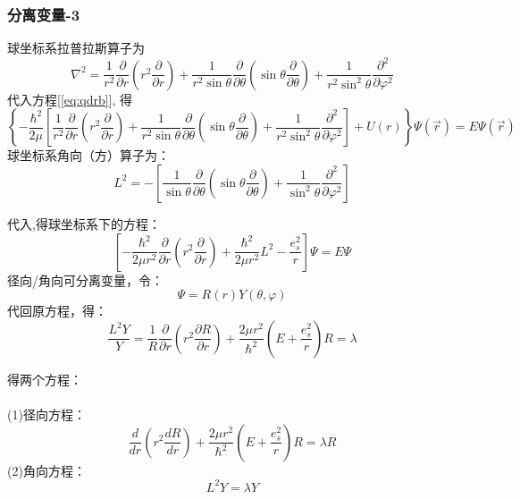 \begin{frame}
\frametitle{分离变量-3}	
球坐标系拉普拉斯算子为 
$$\nabla ^2 =\frac{1}{r^2} \frac{\partial }{\partial r} (r^2\frac{\partial }{\partial r} )+
\frac{1}{r^2 \sin \theta  } \frac{\partial }{\partial \theta } (\sin \theta \frac{\partial }{\partial \theta } )
+\frac{1}{r^2 \sin^2 \theta  } \frac{\partial^2}{\partial\varphi ^2}$$
代入方程[\ref{eq:qdrb}], 得
{\small \begin{equation*}
  \left\{-\frac{\hbar^2}{2 \mu} \left[\frac{1}{r^2} \frac{\partial }{\partial r} (r^2\frac{\partial }{\partial r} )+
  \frac{1}{r^2 \sin \theta  } \frac{\partial }{\partial \theta } (\sin \theta \frac{\partial }{\partial \theta } )
  +\frac{1}{r^2 \sin^2 \theta  } \frac{\partial^2}{\partial\varphi ^2}\right] +U(r) \right\} \Psi (\vec{r}) =E \Psi (\vec{r}) 
\end{equation*}}
球坐标系角向（方）算子为：
\begin{equation*}
  L^2 =  -\left[ \frac{1}{ \sin \theta  } \frac{\partial }{\partial \theta } (\sin \theta \frac{\partial }{\partial \theta } )
  +\frac{1}{ \sin^2 \theta  } \frac{\partial^2}{\partial\varphi ^2} \right]
\end{equation*}		
\end{frame}	

\begin{frame}
代入,得球坐标系下的方程：
\begin{equation*}
  \left[-\frac{\hbar^2}{2 \mu r^2}  \frac{\partial }{\partial r} (r^2\frac{\partial }{\partial r} ) +  \frac{\hbar ^2 }{2 \mu r^2} L^2  -\frac{e_s ^2}{r} \right] \Psi
  =E\Psi
\end{equation*}
径向/角向可分离变量，令： 
\begin{equation*}
  \Psi=R (r) Y(\theta,\varphi)
\end{equation*}	
代回原方程，得：
\begin{equation*}
  \frac{ L^2 Y}{Y}= \frac{1}{R}   \frac{\partial }{\partial r} (r^2\frac{\partial R }{\partial r} ) + \frac{2 \mu r^2} {\hbar^2}(E+ \frac{e_s ^2}{r} ) R =\lambda
\end{equation*}	
\end{frame}		

\begin{frame}
得两个方程：	\\
~~\\ 
(1)径向方程：
\begin{equation*}
  \frac{d}{d r} (r^2\frac{d R }{d r} ) + \frac{2 \mu r^2} {\hbar^2}(E+ \frac{e_s ^2}{r} ) R =\lambda R
\end{equation*}
(2)角向方程：
\begin{equation*}
  L^2 Y=\lambda Y
\end{equation*}	
\end{frame}	

